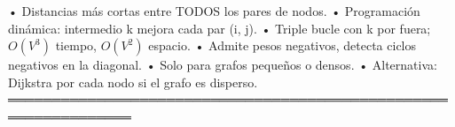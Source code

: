 \begin{dsaresumen}

• Distancias más cortas entre TODOS los pares de nodos.
• Programación dinámica: intermedio k mejora cada par (i, j).
• Triple bucle con k por fuera; $O(V^3)$ tiempo, $O(V^2)$ espacio.
• Admite pesos negativos, detecta ciclos negativos en la diagonal.
• Solo para grafos pequeños o densos.
• Alternativa: Dijkstra por cada nodo si el grafo es disperso.
════════════════════════════════════════════════════════════════

\end{dsaresumen}
